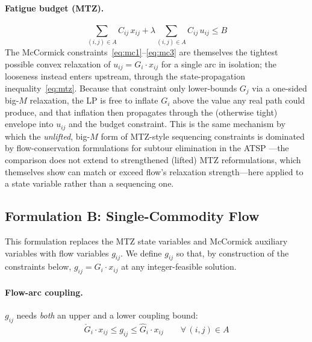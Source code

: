 \documentclass[11pt,a4paper]{article}
\begin{document}
\paragraph{Fatigue budget (MTZ).}

\begin{equation}
  \sum_{(i,j) \in A} C_{ij} \, x_{ij} + \lambda \sum_{(i,j) \in A} C_{ij} \, u_{ij} \leq B
  \label{eq:fatigue_budget}
\end{equation}
The McCormick constraints~\eqref{eq:mc1}--\eqref{eq:mc3} are themselves the tightest possible convex relaxation of $u_{ij} = G_i \cdot x_{ij}$ for a single arc in isolation; the looseness instead enters upstream, through the state-propagation inequality~\eqref{eq:mtz}. Because that constraint only lower-bounds $G_j$ via a one-sided big-$M$ relaxation, the LP is free to inflate $G_i$ above the value any real path could produce, and that inflation then propagates through the (otherwise tight) envelope into $u_{ij}$ and the budget constraint. This is the same mechanism by which the \emph{unlifted}, big-$M$ form of MTZ-style sequencing constraints is dominated by flow-conservation formulations for subtour elimination in the ATSP \citep{oncan2009comparative}---the comparison does not extend to strengthened (lifted) MTZ reformulations, which \citet{oncan2009comparative} themselves show can match or exceed flow's relaxation strength---here applied to a state variable rather than a sequencing one.

\subsection{Formulation B: Single-Commodity Flow}
\label{sec:formulation_flow}

This formulation replaces the MTZ state variables and McCormick auxiliary variables with flow variables $g_{ij}$.
We define $g_{ij}$ so that, by construction of the constraints below, $g_{ij} = G_i \cdot x_{ij}$ at any integer-feasible solution.

\paragraph{Flow-arc coupling.}
$g_{ij}$ needs \emph{both} an upper and a lower coupling bound:
\begin{equation}
  \check{G}_i \cdot x_{ij} \leq g_{ij} \leq \hat{G}_i \cdot x_{ij} \qquad \forall\, (i,j) \in A
  \label{eq:flow_coupling}
\end{equation}
\end{document}
